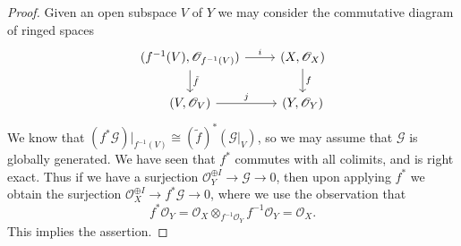\begin{proof}
Given an open subspace $V$ of $Y$ we may consider the commutative diagram
of ringed spaces
\[\begin{tikzcd}
(f^{-1}(V),\mathscr{O}_{f^{-1}(V)})\ar[r,"i"]\ar[d,"\tilde{f}"]&(X,\mathscr{O}_X)\ar[d,"f"]\\
(V,\mathscr{O}_V)\ar[r,"j"]&(Y,\mathscr{O}_Y)
\end{tikzcd}\]
We know that $(f^*\mathscr{G})|_{f^{-1}(V)}\cong(\tilde{f})^*(\mathscr{G}|_V)$, so we may assume that $\mathscr{G}$ is globally generated. We have seen that $f^*$ commutes with all colimits, and is right exact. Thus if we have a surjection $\mathscr{O}_Y^{\oplus I}\to\mathscr{G}\to 0$, then upon applying $f^*$ we obtain the surjection $\mathscr{O}_X^{\oplus I}\to f^*\mathscr{G}\to 0$, where we use the observation that
\[f^*\mathscr{O}_Y=\mathscr{O}_X\otimes_{f^{-1}\mathscr{O}_Y}f^{-1}\mathscr{O}_Y=\mathscr{O}_X.\]
This implies the assertion.
\end{proof}
